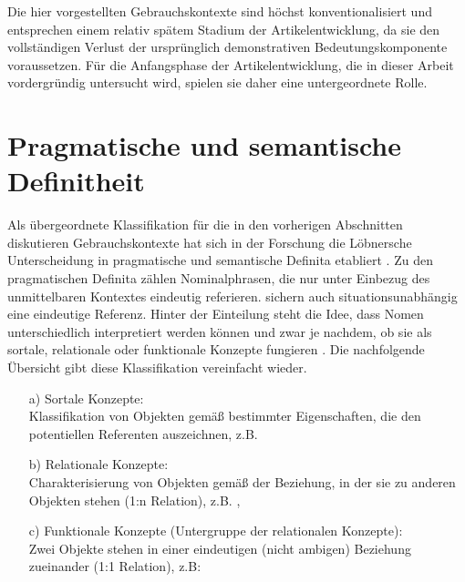 Die hier vorgestellten Gebrauchskontexte sind höchst konventionalisiert und entsprechen einem relativ spätem Stadium der Artikelentwicklung, da sie den vollständigen Verlust der ursprünglich demonstrativen Bedeutungskomponente voraussetzen. Für die Anfangsphase der Artikelentwicklung, die in dieser Arbeit vordergründig untersucht wird, spielen sie daher eine untergeordnete Rolle.


\section{Pragmatische und semantische Definitheit}\label{sec:pragsem}

Als übergeordnete Klassifikation für die in den vorherigen Abschnitten diskutieren Gebrauchskontexte hat sich in der Forschung die Löbnersche Unterscheidung in pragmatische  und semantische Definita  \parencite{Lobner1985} etabliert \parencite{Himmelmann1997, Demske2001,Nubling2005,Napoli2009,Szczepaniak2011a}. Zu den pragmatischen Definita  zählen  Nominalphrasen, die nur unter Einbezug des unmittelbaren Kontextes eindeutig referieren.  sichern auch situationsunabhängig eine eindeutige Referenz. Hinter der Einteilung steht die Idee, dass Nomen unterschiedlich interpretiert werden können und zwar je nachdem, ob sie als sortale, relationale oder funktionale Konzepte fungieren \parencite{Lobner1985,Lobner1998}. Die nachfolgende Übersicht gibt diese Klassifikation vereinfacht wieder. 

\begin{itemize} 
		\item[a)] \label{sort} Sortale Konzepte: \\ Klassifikation von Objekten gemäß bestimmter Eigenschaften, die den potentiellen Referenten auszeichnen, z.B.  
		\item[b)] \label{relat} Relationale Konzepte: \\  Charakterisierung von Objekten gemäß der Beziehung, in der sie zu anderen Objekten stehen (1:n Relation), z.B. ,  
		\item[c)] \label{funkt} Funktionale Konzepte (Untergruppe der relationalen Konzepte): \\  Zwei Objekte stehen in einer eindeutigen (nicht ambigen) Beziehung zueinander (1:1 Relation), z.B:  
\end{itemize} 

